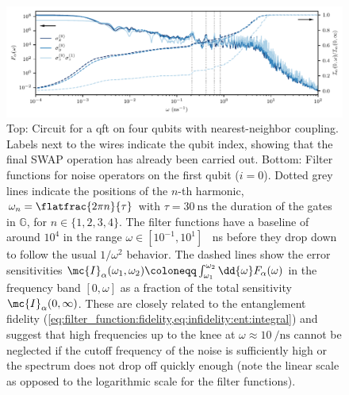 \begin{figure}[tbp]
    \centerline{}
    \includegraphics[width=\textwidth]{img/qft_filter_function_first_qubit_with_cumulative_fraction.pdf}
    \caption{Top: Circuit for a \gls{qft} on four qubits with nearest-neighbor coupling. Labels next to the wires indicate the qubit index, showing that the final SWAP operation has already been carried out. Bottom: Filter functions for noise operators on the first qubit ($i = 0$). Dotted grey lines indicate the positions of the $n$-th harmonic, $\omega_n = \flatfrac{2\pi n}{\tau}$ with $\tau = \SI{30}{\nano\second}$ the duration of the gates in $\mathbb{G}$, for $n\in\lbrace 1, 2, 3, 4\rbrace$. The filter functions have a baseline of around $10^4$ in the range $\omega\in[10^{-1}, 10^{1}]$ \si{\per\nano\second} before they drop down to follow the usual $1/\omega^2$ behavior. The dashed lines show the error sensitivities $\mc{I}_\alpha(\omega_1,\omega_2)\coloneqq\int_{\omega_1}^{\omega_2}\dd{\omega} F_\alpha(\omega)$ in the frequency band $[0, \omega]$ as a fraction of the total sensitivity $\mc{I}_\alpha(0,\infty)$. These are closely related to the entanglement fidelity (\cf \cref{eq:filter_function:fidelity,eq:infidelity:ent:integral}) and suggest that high frequencies up to the knee at $\omega\approx\SI{10}{\per\nano\second}$ cannot be neglected if the cutoff frequency of the noise is sufficiently high or the spectrum does not drop off quickly enough (note the linear scale as opposed to the logarithmic scale for the filter functions).}
    \label{fig:qft}
\end{figure}


